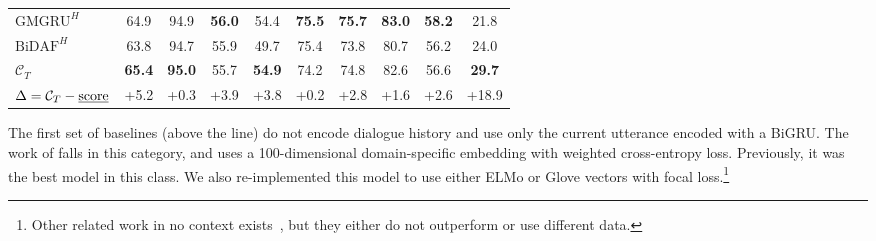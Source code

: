 \begin{table}[!htp]
\begin{center}
{\begin{tabular}{lccccccccc}
$\text{GMGRU}^{H}$                             & 64.9                 & 94.9                 & {\bf 56.0}           & 54.4             & {\bf 75.5}       & {\bf 75.7}       & {\bf 83.0}       & {\bf 58.2}       & 21.8             \\
$\text{BiDAF}^{H}$                             & 63.8                 & 94.7                 & 55.9                 & 49.7             & 75.4             & 73.8             & 80.7             & 56.2             & 24.0             \\ \midrule
$\mathcal{C}_{T}$                              & {\bf 65.4}           & {\bf 95.0}           & 55.7                 & {\bf 54.9}       & 74.2             & 74.8             & 82.6             & 56.6             & {\bf 29.7}       \\
$\Delta=\mathcal{C}_{T} - \text{\underline{score}}$ & {\footnotesize +5.2} & {\footnotesize +0.3} & {\footnotesize +3.9} & {\footnotesize +3.8} & {\footnotesize +0.2} & {\footnotesize +2.8} & {\footnotesize +1.6} & {\footnotesize +2.6} & {\footnotesize +18.9}                                                                                                \\ \bottomrule
\end{tabular}}
\end{center}
\end{table}

The first set of baselines (above the line) do not encode dialogue
history and use only the current utterance encoded with a BiGRU. The
work of \citet{xiao2016behavioral} falls in this category, and uses a
100-dimensional domain-specific embedding with weighted cross-entropy
loss. Previously, it was the best model in this class. We also
re-implemented this model to use either ELMo or Glove vectors with
focal loss.\footnote{Other related work in no context
  exists~\cite[e.g.,][]{perez2017predicting, gibson2017attention}, but
  they either do not outperform \cite{xiao2016behavioral} or use
  different data.}

